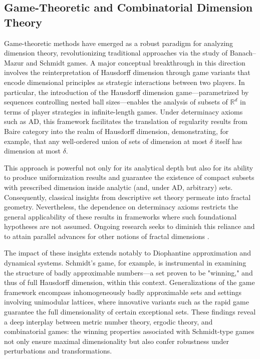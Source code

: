 \documentclass[sigconf]{acmart}
\begin{document}
\subsection{Game-Theoretic and Combinatorial Dimension Theory}

Game-theoretic methods have emerged as a robust paradigm for analyzing dimension theory, revolutionizing traditional approaches via the study of Banach–Mazur and Schmidt games. A major conceptual breakthrough in this direction involves the reinterpretation of Hausdorff dimension through game variants that encode dimensional principles as strategic interactions between two players. In particular, the introduction of the Hausdorff dimension game—parametrized by sequences controlling nested ball sizes—enables the analysis of subsets of $\mathbb{R}^d$ in terms of player strategies in infinite-length games. Under determinacy axioms such as AD, this framework facilitates the translation of regularity results from Baire category into the realm of Hausdorff dimension, demonstrating, for example, that any well-ordered union of sets of dimension at most $\delta$ itself has dimension at most $\delta$. 

This approach is powerful not only for its analytical depth but also for its ability to produce uniformization results and guarantee the existence of compact subsets with prescribed dimension inside analytic (and, under AD, arbitrary) sets. Consequently, classical insights from descriptive set theory permeate into fractal geometry. Nevertheless, the dependence on determinacy axioms restricts the general applicability of these results in frameworks where such foundational hypotheses are not assumed. Ongoing research seeks to diminish this reliance and to attain parallel advances for other notions of fractal dimensions \cite{ref77}.

The impact of these insights extends notably to Diophantine approximation and dynamical systems. Schmidt's game, for example, is instrumental in examining the structure of badly approximable numbers—a set proven to be "winning," and thus of full Hausdorff dimension, within this context. Generalizations of the game framework encompass inhomogeneously badly approximable sets and settings involving unimodular lattices, where innovative variants such as the rapid game guarantee the full dimensionality of certain exceptional sets. These findings reveal a deep interplay between metric number theory, ergodic theory, and combinatorial games: the winning properties associated with Schmidt-type games not only ensure maximal dimensionality but also confer robustness under perturbations and transformations. 
\end{document}
